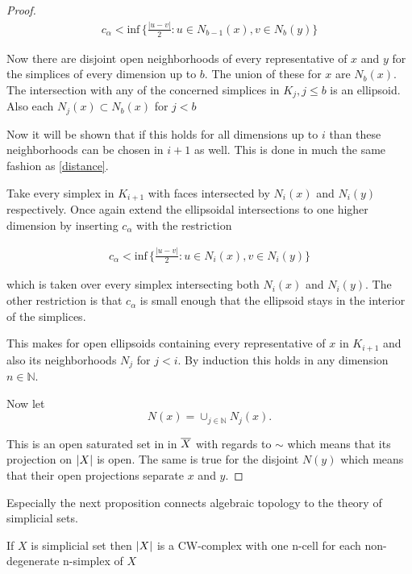 \documentclass[../../main.tex]{subfiles}
\begin{document}
\begin{proof}
        \begin{align}\label{distance}
            c_\alpha < \text{inf}\,\{\frac{|u-v|}{2}: u \in N_{b-1}(x), v \in N_b(y)\}
        \end{align}

        Now there are disjoint open neighborhoods of every representative of $x$ and $y$ for the simplices of every dimension up to $b$. The union of these for $x$ are $N_b(x)$. The intersection with any of the concerned simplices in $K_j, j \leq b$ is an ellipsoid. Also each $N_j(x) \subset N_b(x)$ for $j < b$

        Now it will be shown that if this holds for all dimensions up to $i$ than these neighborhoods can be chosen in $i+1$ as well. This is done in much the same fashion as \eqref{distance}.

        Take every simplex in $K_{i+1}$ with faces intersected by $N_i(x)$ and $N_i(y)$ respectively. Once again extend the ellipsoidal intersections to one higher dimension by inserting $c_\alpha$ with the restriction

        \begin{align*}
            c_\alpha < \text{inf}\,\{\frac{|u-v|}{2}: u \in N_{i}(x), v \in N_i(y)\}
        \end{align*}

        which is taken over every simplex intersecting both $N_i(x)$ and $N_i(y)$. The other restriction is that $c_\alpha$ is small enough that the ellipsoid stays in the interior of the simplices.

        This makes for open ellipsoids containing every representative of $x$ in $K_{i+1}$ and also its neighborhoods $N_j$ for $j < i$. By induction this holds in any dimension $n \in \mathbb{N}$.

        Now let \[N(x) = \cup_{j \in \mathbb{N}} N_j(x).\]

        This is an open saturated set in in $\bigGeom X$ with regards to $\sim$ which means that its projection on $\geom[X]$ is open. The same is true for the disjoint $N(y)$ which means that their open projections separate $x$ and $y$.
    \end{proof}
    
    Especially the next proposition connects algebraic topology to the theory of simplicial sets.

    \begin{proposition}\label{is-CW}
        If $X$ is simplicial set then $\geom[X]$ is a CW-complex with one n-cell for each non-degenerate n-simplex of $X$ 
    \end{proposition}
\end{document}
